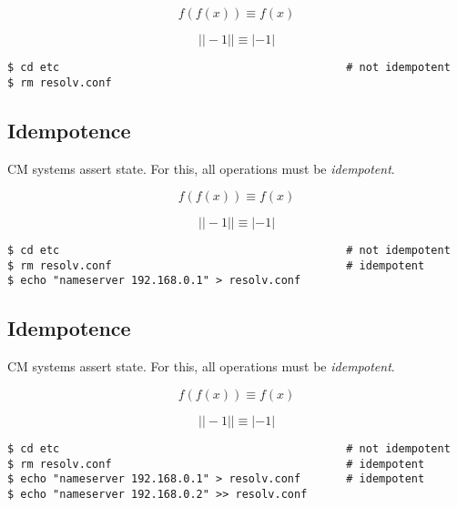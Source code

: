 \documentclass[xga]{xdvislides}
\begin{document}
\begin{displaymath}
f(f(x)) \equiv f(x)
\end{displaymath}

\begin{displaymath}
| |-1| | \equiv |-1|
\end{displaymath}

\begin{verbatim}
$ cd etc                                            # not idempotent
$ rm resolv.conf
\end{verbatim}

\subsection{Idempotence}
CM systems assert state.  For this, all operations
must be {\em idempotent}. \\
\vspace{.5in}

\begin{displaymath}
f(f(x)) \equiv f(x)
\end{displaymath}

\begin{displaymath}
| |-1| | \equiv |-1|
\end{displaymath}

\begin{verbatim}
$ cd etc                                            # not idempotent
$ rm resolv.conf                                    # idempotent
$ echo "nameserver 192.168.0.1" > resolv.conf
\end{verbatim}

\subsection{Idempotence}
CM systems assert state.  For this, all operations
must be {\em idempotent}. \\
\vspace{.5in}

\begin{displaymath}
f(f(x)) \equiv f(x)
\end{displaymath}

\begin{displaymath}
| |-1| | \equiv |-1|
\end{displaymath}

\begin{verbatim}
$ cd etc                                            # not idempotent
$ rm resolv.conf                                    # idempotent
$ echo "nameserver 192.168.0.1" > resolv.conf       # idempotent
$ echo "nameserver 192.168.0.2" >> resolv.conf
\end{verbatim}
\end{document}

